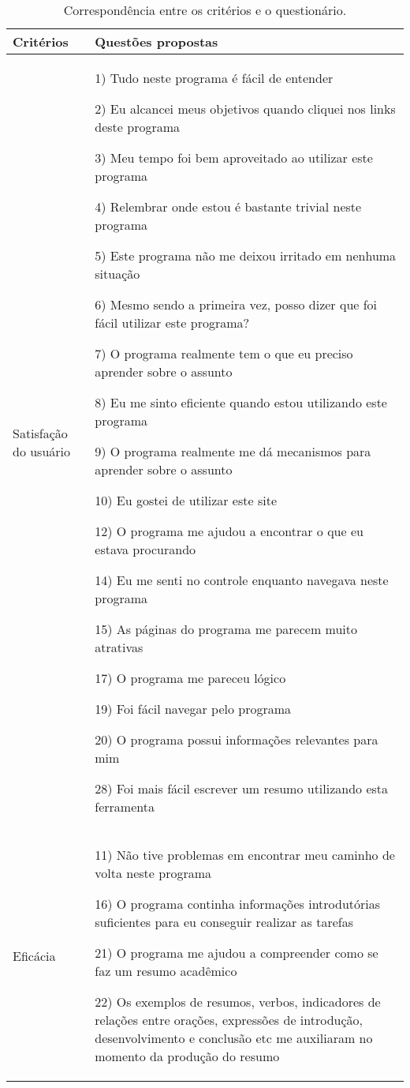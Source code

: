 \documentclass[portuguese]{textolivre}
\begin{document}
\begin{table}[htbp]
\begin{threeparttable}
\caption{Correspondência entre os critérios e o questionário.}
\label{tbl1}
\centering
\begin{small}
\begin{tabular}{p{2cm} p{8cm}}
\toprule
Critérios & Questões propostas \\ 
\midrule
Satisfação do usuário & 
1) Tudo neste programa é fácil de entender

2) Eu alcancei meus objetivos quando cliquei nos links deste programa

3) Meu tempo foi bem aproveitado ao utilizar este programa

4) Relembrar onde estou é bastante trivial neste programa

5) Este programa não me deixou irritado em nenhuma situação

6) Mesmo sendo a primeira vez, posso dizer que foi fácil utilizar este programa?

7) O programa realmente tem o que eu preciso aprender sobre o assunto

8) Eu me sinto eficiente quando estou utilizando este programa

9) O programa realmente me dá mecanismos para aprender sobre o assunto

10) Eu gostei de utilizar este site

12) O programa me ajudou a encontrar o que eu estava procurando

14) Eu me senti no controle enquanto navegava neste programa

15) As páginas do programa me parecem muito atrativas

17) O programa me pareceu lógico

19) Foi fácil navegar pelo programa

20) O programa possui informações relevantes para mim

28) Foi mais fácil escrever um resumo utilizando esta ferramenta \\ 
Eficácia & 
11) Não tive problemas em encontrar meu caminho de volta neste programa

16) O programa continha informações introdutórias suficientes para eu conseguir realizar as tarefas

21) O programa me ajudou a compreender como se faz um resumo acadêmico

22) Os exemplos de resumos, verbos, indicadores de relações entre orações, expressões de introdução, desenvolvimento e conclusão etc me auxiliaram no momento da produção do resumo


\end{tabular}
\end{small}
\end{threeparttable}
\end{table}
\end{document}
